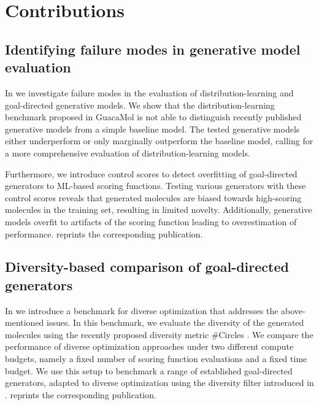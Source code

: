 \section{Contributions\label{sec:contributions}}
\subsection{Identifying failure modes in generative model evaluation}
In \citep{renzFailureModesMolecule2019} we investigate failure modes in the evaluation of
distribution-learning and goal-directed generative models. We show that the distribution-learning
benchmark proposed in GuacaMol \citep{brownGuacaMolBenchmarkingModels2019} is not able to
distinguish recently published generative models from a simple baseline model. The tested generative
models either underperform or only marginally outperform the baseline model, calling for a more
comprehensive evaluation of distribution-learning models.

Furthermore, we introduce control scores to detect overfitting of goal-directed generators to
\ac{ML}-based scoring functions. Testing various generators with these control scores reveals that
generated molecules are biased towards high-scoring molecules in the training set, resulting in
limited novelty. Additionally, generative models overfit to artifacts of the scoring function
leading to overestimation of performance.  reprints the corresponding
publication.

\subsection{Diversity-based comparison of goal-directed generators\label{sec:divopt}} In
\citep{renzDiverseHitsNovo2024} we introduce a benchmark for diverse optimization that addresses the
above-mentioned issues. In this benchmark, we evaluate the diversity of the generated molecules
using the recently proposed diversity metric \#Circles \citep{xieHowMuchSpace2023}. We compare the
performance of diverse optimization approaches under two different compute budgets, namely a fixed
number of scoring function evaluations and a fixed time budget. We use this setup to benchmark a
range of established goal-directed generators, adapted to diverse optimization using the diversity
filter introduced in \citep{blaschkeMemoryassistedReinforcementLearning2020}.
 reprints the corresponding publication.

